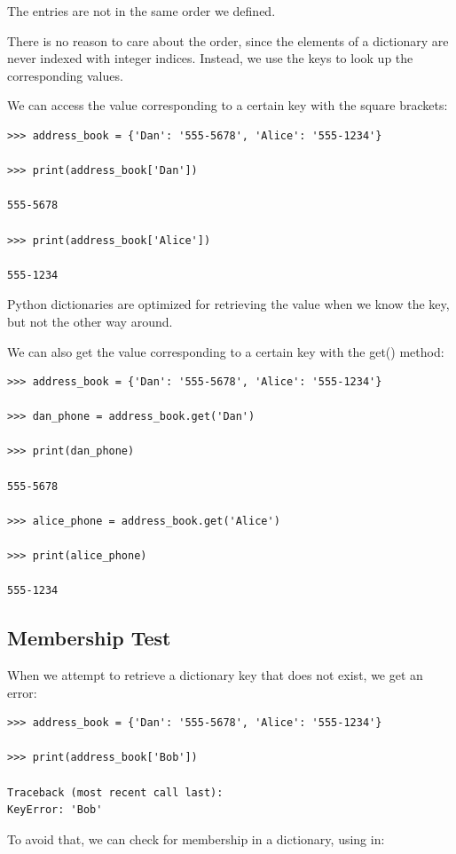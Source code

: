 \documentclass{article}
\begin{document}
The entries are not in the same order we defined.

There is no reason to care about the order, since the elements of a dictionary are never indexed with integer indices. Instead, we use the keys to look up the corresponding values.

We can access the value corresponding to a certain key with the square brackets:

\begin{lstlisting}
>>> address_book = {'Dan': '555-5678', 'Alice': '555-1234'}

>>> print(address_book['Dan'])

555-5678

>>> print(address_book['Alice'])

555-1234
\end{lstlisting}

Python dictionaries are optimized for retrieving the value when we know the key, but not the other way around.

We can also get the value corresponding to a certain key with the get() method:

\begin{lstlisting}
>>> address_book = {'Dan': '555-5678', 'Alice': '555-1234'}

>>> dan_phone = address_book.get('Dan')

>>> print(dan_phone)

555-5678

>>> alice_phone = address_book.get('Alice')

>>> print(alice_phone)

555-1234
\end{lstlisting}

\subsection{Membership Test}

When we attempt to retrieve a dictionary key that does not exist, we get an error:

\begin{lstlisting}
>>> address_book = {'Dan': '555-5678', 'Alice': '555-1234'}

>>> print(address_book['Bob'])

Traceback (most recent call last):
KeyError: 'Bob'
\end{lstlisting}

To avoid that,  we can check for membership in a dictionary, using in:
\end{document}

